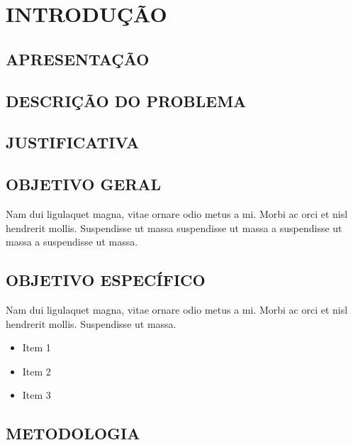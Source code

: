 \chapter{INTRODUÇÃO} %
\lipsum[1-2]
\section{APRESENTAÇÃO}
\lipsum[1-1]

\section{DESCRIÇÃO DO PROBLEMA}
\lipsum[1-1]

\section{JUSTIFICATIVA}
\lipsum[1-1]

\section{OBJETIVO GERAL}
Nam dui ligulaquet magna, vitae ornare odio metus a mi. Morbi ac orci et nisl hendrerit mollis. Suspendisse ut massa suspendisse ut massa a suspendisse ut massa a suspendisse ut massa.

 \section{OBJETIVO ESPECÍFICO}
Nam dui ligulaquet magna, vitae ornare odio metus a mi. Morbi ac orci et nisl hendrerit mollis. Suspendisse ut massa.
 \begin{itemize}
	\item Item 1
	\item Item 2
	\item Item 3
\end{itemize}

 \section{METODOLOGIA}
 \lipsum[1-1]